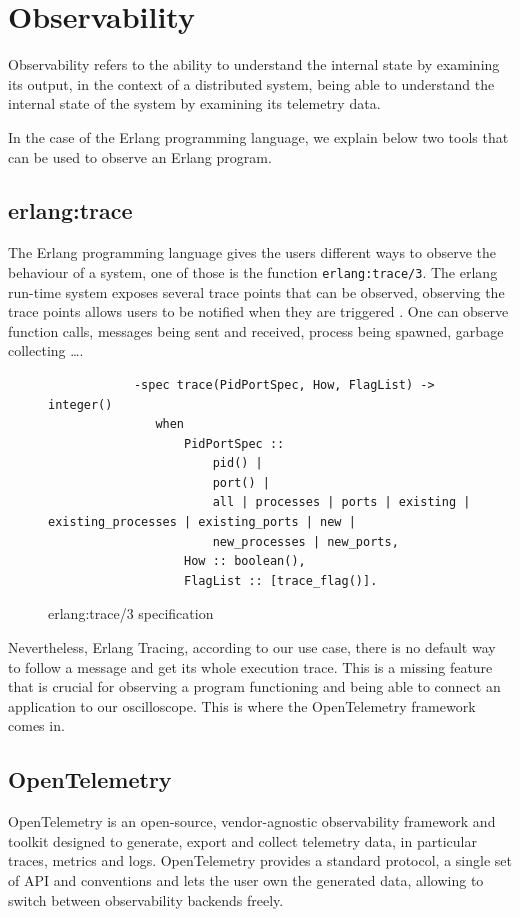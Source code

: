 \section{Observability}
        Observability refers to the ability to understand the internal state by examining its output, in the context of a distributed system, being able to understand the internal state of the system by examining its telemetry data. \cite{otel-o}

    In the case of the Erlang programming language, we explain below two tools that can be used to observe an Erlang program.
    
    \subsection{erlang:trace}
        The Erlang programming language gives the users different ways to observe the behaviour of a system, one of those is the function \texttt{erlang:trace/3}. The erlang run-time system exposes several trace points that can be observed, observing the trace points allows users to be notified when they are triggered \cite{erl-t}. One can observe function calls, messages being sent and received, process being spawned, garbage collecting \dots. 
        \begin{figure}[!ht]
        \centering
        \begin{verbatim}
            -spec trace(PidPortSpec, How, FlagList) -> integer()
               when
                   PidPortSpec ::
                       pid() |
                       port() |
                       all | processes | ports | existing | existing_processes | existing_ports | new |
                       new_processes | new_ports,
                   How :: boolean(),
                   FlagList :: [trace_flag()].
        \end{verbatim}
        \caption{erlang:trace/3 specification}
\end{figure}

    Nevertheless, Erlang Tracing, according to our use case, there is no default way to follow a message and get its whole execution trace. This is a missing feature that is crucial for observing a program functioning and being able to connect an application to our oscilloscope.  This is where the OpenTelemetry framework comes in.

\subsection{OpenTelemetry}
    OpenTelemetry is an open-source, vendor-agnostic observability framework and toolkit designed to generate, export and collect telemetry data, in particular traces, metrics and logs. OpenTelemetry provides a standard protocol, a single set of API and conventions and lets the user own the generated data, allowing to switch between observability backends freely. \cite{otel-o}
   
